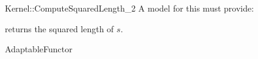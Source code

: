 \begin{ccRefFunctionObjectConcept}{Kernel::ComputeSquaredLength_2}
A model for this must provide:


       {returns the squared length of $s$. }

\ccRefines
AdaptableFunctor

\ccSeeAlso
{} \\

\end{ccRefFunctionObjectConcept}
